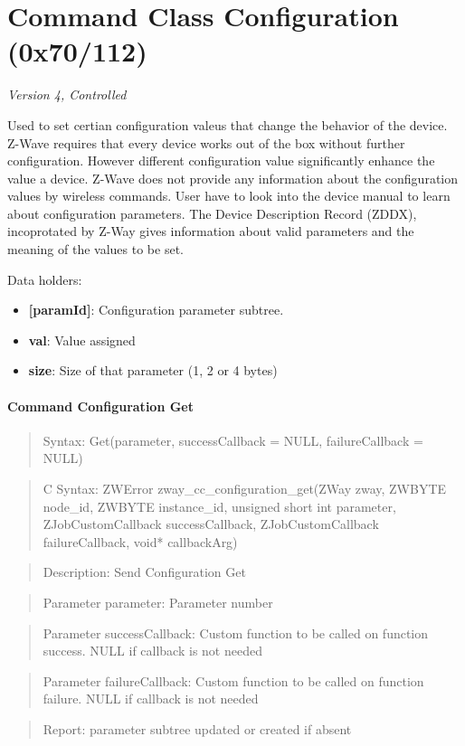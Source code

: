\section{Command Class Configuration (0x70/112)}

\textit{Version 4, Controlled}
\newline

Used to set certian configuration valeus that change the behavior of the device. Z-Wave requires that every device works out of the box without further configuration. However different configuration value significantly enhance the value a device. Z-Wave does not provide any information about the configuration values by wireless commands. User have to look into the device manual to learn about configuration parameters. The Device Description Record (ZDDX), incoprotated by Z-Way gives information about valid parameters and the meaning of the values to be set.
\newline

\noindent
Data holders:

\begin{itemize}
\item \textbf{[paramId]}: Configuration parameter subtree.
\item \qquad\textbf{val}: Value assigned
\item \qquad\textbf{size}: Size of that parameter (1, 2 or 4 bytes)
\end{itemize}

\paragraph{Command Configuration Get}
\begin{quote}Syntax: Get(parameter, successCallback = NULL, failureCallback = NULL)\end{quote}
\begin{quote}C Syntax: ZWError zway\_cc\_configuration\_get(ZWay zway, ZWBYTE node\_id, ZWBYTE instance\_id, unsigned short int parameter, ZJobCustomCallback successCallback, ZJobCustomCallback failureCallback, void* callbackArg)\end{quote}
\begin{quote}Description: Send Configuration Get\end{quote}
\begin{quote}Parameter parameter: Parameter number\end{quote}
\begin{quote}Parameter successCallback: Custom function to be called on function success. NULL if callback is not needed\end{quote}
\begin{quote}Parameter failureCallback: Custom function to be called on function failure. NULL if callback is not needed\end{quote}
\begin{quote}Report: parameter subtree updated or created if absent\end{quote}

